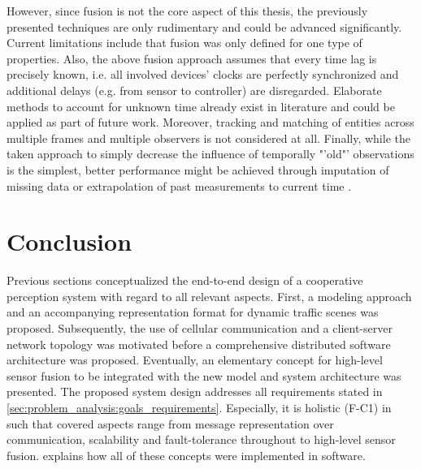 However, since fusion is not the core aspect of this thesis, the previously presented techniques are only rudimentary and could be advanced significantly. Current limitations include that fusion was only defined for one type of properties. Also, the above fusion approach assumes that every time lag is precisely known, i.e. all involved devices' clocks are perfectly synchronized and additional delays (e.g. from sensor to controller) are disregarded. Elaborate methods to account for unknown time already exist in literature \cite{Julier} and could be applied as part of future work. Moreover, tracking and matching of entities across multiple frames and multiple observers is not considered at all. Finally, while the taken approach to simply decrease the influence of temporally "'old"' observations is the simplest, better performance might be achieved through imputation of missing data or extrapolation of past measurements to current time \cite{Chen2019}. 

\section{Conclusion}
\label{sec:concept_design:conclusion}
Previous sections conceptualized the end-to-end design of a cooperative perception system with regard to all relevant aspects. First, a modeling approach and an accompanying representation format for dynamic traffic scenes was proposed. Subsequently, the use of cellular communication and a client-server network topology was motivated before a comprehensive distributed software architecture was proposed. Eventually, an elementary concept for high-level sensor fusion to be integrated with the new model and system architecture was presented. The proposed system design addresses all requirements stated in \cref{sec:problem_analysis:goals_requirements}. Especially, it is holistic (F-C1) in such that covered aspects range from message representation over communication, scalability and fault-tolerance throughout to high-level sensor fusion.  explains how all of these concepts were implemented in software. 